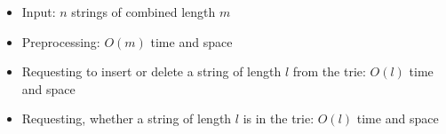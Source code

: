 \begin{itemize}
	\item Input: $n$ strings of combined length $m$
	\item Preprocessing: $O(m)$ time and space
	\item Requesting to insert or delete a string of length $l$ from the trie: $O(l)$ time and space
	\item Requesting, whether a string of length $l$ is in the trie: $O(l)$ time and space
\end{itemize}